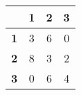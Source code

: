 \begin{tabular}{l|ccc}
\toprule
&\textbf{1} & \textbf{2} & \textbf{3}\\
\midrule
\textbf{1} & 3 & 6 & 0\\
\textbf{2} & 8 & 3 & 2\\
\textbf{3} & 0 & 6 & 4\\
\bottomrule
\end{tabular}
